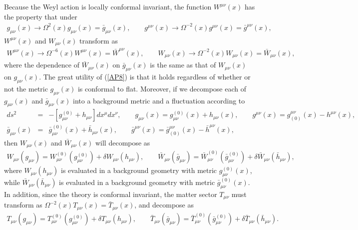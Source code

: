 \documentclass[aps]{revtex4}
\begin{document}
Because the Weyl action is locally conformal invariant, the function $W^{\mu\nu}(x)$ has the property that under 
%
\begin{eqnarray}
g_{\mu\nu}(x)\rightarrow \Omega^2(x) g_{\mu\nu}(x)=\bar{g}_{\mu\nu}(x),\qquad
g^{\mu\nu}(x)\rightarrow \Omega^{-2}(x) g^{\mu\nu}(x)=\bar{g}^{\mu\nu}(x),
\label{AP7}
\end{eqnarray}
% 
$W^{\mu\nu}(x)$ and $W_{\mu\nu}(x)$ transform as 
%
\begin{eqnarray}
W^{\mu\nu}(x)\rightarrow \Omega^{-6}(x) W^{\mu\nu}(x)=\bar{W}^{\mu\nu}(x),\qquad
W_{\mu\nu}(x)\rightarrow \Omega^{-2}(x) W_{\mu\nu}(x)=\bar{W}_{\mu\nu}(x),
\label{AP8}
\end{eqnarray}
%
where the dependence of $\bar{W}_{\mu\nu}(x)$ on $\bar{g}_{\mu\nu}(x)$ is the same as that of 
$W_{\mu\nu}(x)$ on $g_{\mu\nu}(x)$. The great utility of (\ref{AP8}) is that it holds regardless of whether or not the metric $g_{\mu\nu}(x)$ is conformal to flat. Moreover,  if we decompose each of $g_{\mu\nu}(x)$ and $\bar{g}_{\mu\nu}(x)$ into a background metric and a fluctuation according to
%
\begin{eqnarray}
ds^2&=&-[g^{(0)}_{\mu\nu}+h_{\mu\nu}]dx^{\mu}dx^{\nu},\qquad g_{\mu\nu}(x)=g^{(0)}_{\mu\nu}(x)+h_{\mu\nu}(x),\qquad g^{\mu\nu}(x)=g_{(0)}^{\mu\nu}(x)-h^{\mu\nu}(x),
\nonumber\\
\bar{g}_{\mu\nu}(x)&=&\bar{g}^{(0)}_{\mu\nu}(x)+\bar{h}_{\mu\nu}(x), \qquad\bar{g}^{\mu\nu}(x)=\bar{g}_{(0)}^{\mu\nu}(x)-\bar{h}^{\mu\nu}(x),
\label{AP9}
\end{eqnarray}
% 
then $W_{\mu\nu}(x)$ and $\bar{W}_{\mu\nu}(x)$ will decompose as 
%
\begin{eqnarray}
W_{\mu\nu}(g_{\mu\nu})= W^{(0)}_{\mu\nu}(g^{(0)}_{\mu\nu})+\delta W_{\mu\nu}(h_{\mu\nu}),\qquad
\bar{W}_{\mu\nu}(\bar{g}_{\mu\nu})=\bar{W}^{(0)}_{\mu\nu}(\bar{g}^{(0)}_{\mu\nu})+\delta \bar{W}_{\mu\nu}(\bar{h}_{\mu\nu}),
\label{AP10}
\end{eqnarray}
%
where $W_{\mu\nu}(h_{\mu\nu})$ is evaluated in a background geometry with metric $g^{(0)}_{\mu\nu}(x)$, while $\bar{W}_{\mu\nu}(\bar{h}_{\mu\nu})$ is evaluated in a background geometry with metric $\bar{g}^{(0)}_{\mu\nu}(x)$. In addition, since the theory is conformal invariant, the matter sector $T_{\mu\nu}$ must transform as $\Omega^{-2}(x) T_{\mu\nu}(x)=\bar{T}_{\mu\nu}(x)$,  and decompose as
%
\begin{eqnarray}
T_{\mu\nu}(g_{\mu\nu})= T^{(0)}_{\mu\nu}(g^{(0)}_{\mu\nu})+\delta T_{\mu\nu}(h_{\mu\nu}),\qquad
\bar{T}_{\mu\nu}(\bar{g}_{\mu\nu})=\bar{T}^{(0)}_{\mu\nu}(\bar{g}^{(0)}_{\mu\nu})+\delta \bar{T}_{\mu\nu}(\bar{h}_{\mu\nu}).
\label{AP11}
\end{eqnarray}
\end{document}
